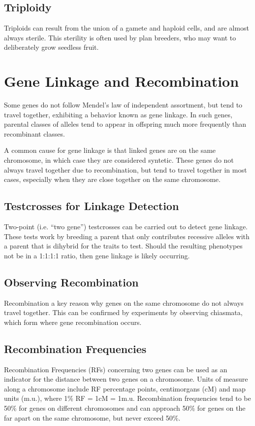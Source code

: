 \documentclass[12pt,titlepage]{article}
\begin{document}
      \subsection{Triploidy}
        Triploids can result from the union of a gamete and haploid cells, and are almost always sterile. This sterility is often used by plan breeders,
        who may want to deliberately grow seedless fruit.

    \section{Gene Linkage and Recombination}
      Some genes do not follow Mendel's law of independent assortment, but tend to travel together, exhibiting a behavior known as gene linkage. In such
      genes, parental classes of alleles tend to appear in offspring much more frequently than recombinant classes.

      A common cause for gene linkage is that linked genes are on the same chromosome, in which case they are considered syntetic. These genes do not always
      travel together due to recombination, but tend to travel together in most cases, especially when they are close together on the same chromosome.

      \subsection{Testcrosses for Linkage Detection}
        Two-point (i.e. ``two gene'') testcrosses can be carried out to detect gene linkage. These tests work by breeding a parent that only contributes
        recessive alleles with a parent that is dihybrid for the traits to test. Should the resulting phenotypes not be in a 1:1:1:1 ratio, then gene linkage
        is likely occurring.

      \subsection{Observing Recombination}
        Recombination a key reason why genes on the same chromosome do not always travel together. This can be confirmed by experiments by observing
        chiasmata, which form where gene recombination occurs.

      \subsection{Recombination Frequencies}
        Recombination Frequencies (RFs) concerning two genes can be used as an indicator for the distance between two genes on a chromosome. Units of measure
        along a chromosome include RF percentage points, centimorgans (cM) and map units (m.u.), where 1\% RF = 1cM = 1m.u. Recombination frequencies tend to
        be 50\% for genes on different chromosomes and can approach 50\% for genes on the far apart on the same chromosome, but never exceed 50\%.
\end{document}
